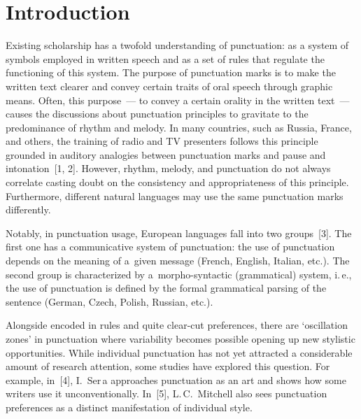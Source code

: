 





 \thispagestyle{myheadings}

 \begin{multicols}{2}

 \label{st\stat}

    \section{Introduction}
    
    
    \noindent
  Existing scholarship has a twofold understanding of punctuation: as a system of 
symbols employed in written speech and as a set of rules that regulate the 
functioning of this system. The purpose of punctuation marks is to make the 
written text clearer and convey certain traits of oral speech through graphic means. 
Often, this purpose~--- to convey a certain orality in the written text~--- causes the 
discussions about punctuation principles to gravitate to the predominance of 
rhythm and melody. In many countries, such as Russia, France, and others, the 
training of radio and TV presenters follows this principle grounded in auditory 
analogies between punctuation marks and pause and intonation~[1, 2]. However, 
rhythm, melody, and punctuation do not always correlate casting doubt on the 
consistency and appropriateness of this principle. Furthermore, different natural 
languages may use the same punctuation marks differently.
  
  Notably, in punctuation usage, European languages fall into two groups~[3]. 
The first one has a communicative system of punctuation: the use of punctuation 
depends on the meaning of a~given message (French, English, Italian, etc.). The 
second group is characterized by a~morpho-syntactic (grammatical) system, i.\,e., 
the use of punctuation is defined by the formal grammatical parsing of the sentence 
(German, Czech, Polish, Russian, etc.).
  
  Alongside encoded in rules and quite clear-cut preferences, there are `oscillation 
zones' in punctuation where variability becomes possible opening up new stylistic 
opportunities. While individual punctuation has not yet attracted a considerable 
amount of research attention, some studies have explored this question. For 
example, in~[4], I.~\mbox{Ser{}\,\!a} approaches punctuation as an art 
and shows how some writers use it unconventionally. In~[5], L.\,C.~Mitchell also 
sees punctuation preferences as a distinct manifestation of individual style.
  

\end{multicols}
